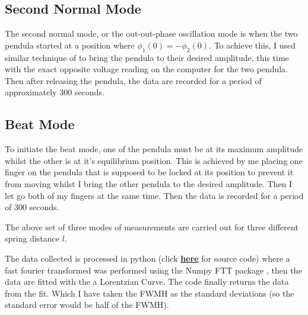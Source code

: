 \documentclass[aps,prl,reprint,10pt,amsmath,amssymb,superscriptaddress,a4paper]{revtex4-2}
\begin{document}
\subsection{Second Normal Mode}
The second normal mode, or the out-out-phase oscillation mode is when the two pendula started at a position where $\phi_1(0) = - \phi_2(0).$ To achieve this, I used similar technique of to bring the pendula to their desired amplitude, this time with the exact opposite voltage reading on the computer for the two pendula. Then after releasing the pendula, the data are recorded for a period of approximately 300 seconds.

\subsection{Beat Mode}
To initiate the beat mode, one of the pendula must be at its maximum amplitude whilst the other is at it's equilibrium position. This is achieved by me placing one finger on the pendula that is supposed to be locked at its position to prevent it from moving whilst I bring the other pendula to the desired amplitude. Then I let go both of my fingers at the same time. Then the data is recorded for a period of 300 seconds.

The above set of three modes of measurements are carried out for three different spring distance $l$. 

The data collected is processed in python (click \href{https://github.com/jojounderscorejo/CheatSheetRepo/blob/main/Otherthings/PHYS2113%20CP%20LAB/code/cp_data_analysis.html}{\textbf{here}} for source code) where a fast fourier transformed was performed using the Numpy FTT package \cite{harris2020array}, then the data are fitted with the a Lorentzian Curve. The code finally returns the data from the fit. Which I have taken the FWMH as the standard deviations (so the standard error would be half of the FWMH).  
\end{document}
